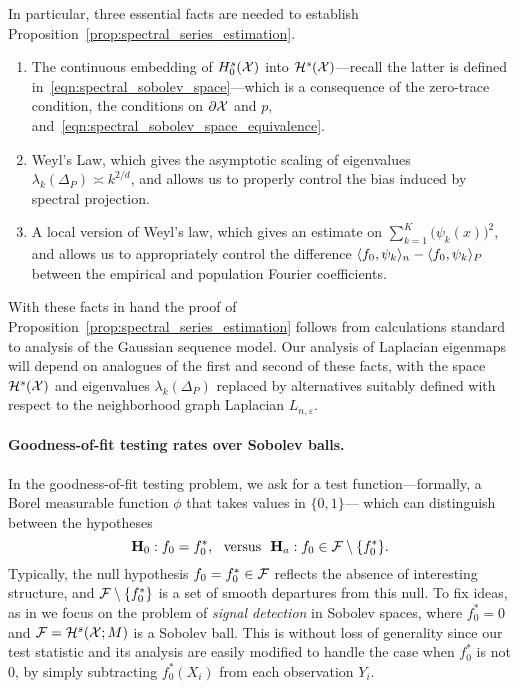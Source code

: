 In particular, three essential facts are needed to establish Proposition~\ref{prop:spectral_series_estimation}. 
\begin{enumerate}
	\item The continuous embedding of $H_0^s(\mathcal{X})$ into $\mathcal{H}^s(\mathcal{X})$---recall the latter is defined in~\eqref{eqn:spectral_sobolev_space}---which is a consequence of the zero-trace condition, the conditions on $\partial \mathcal{X}$ and $p$, and~\eqref{eqn:spectral_sobolev_space_equivalence}.
	\item Weyl's Law, which gives the asymptotic scaling of eigenvalues $\lambda_{k}(\Delta_P) \asymp k^{2/d}$, and allows us to properly control the bias induced by spectral projection.
	\item A local version of Weyl's law, which gives an estimate on $\sum_{k = 1}^{K} \bigl(\psi_k(x)\bigr)^2$, and allows us to appropriately control the difference $\langle f_0, \psi_k \rangle_n - \langle f_0, \psi_k \rangle_P$  between the empirical and population Fourier coefficients.
\end{enumerate}
With these facts in hand the proof of Proposition~\ref{prop:spectral_series_estimation} follows from calculations standard to analysis of the Gaussian sequence model. Our analysis of Laplacian eigenmaps will depend on analogues of the first and second of these facts, with the space $\mathcal{H}^s(\mathcal{X})$ and eigenvalues $\lambda_k(\Delta_P)$ replaced by alternatives suitably defined with respect to the neighborhood graph Laplacian $L_{n,\varepsilon}$.

\paragraph{Goodness-of-fit testing rates over Sobolev balls.}
In the goodness-of-fit testing problem, we ask for a test function---formally, a Borel measurable function $\phi$ that takes values in $\{0,1\}$--- which can distinguish between the hypotheses
\begin{equation}
\mathbf{H}_0: f_0 = f_0^{\ast}, ~~\textrm{versus}~~ \mathbf{H}_a: f_0 \in \mathcal{F} \setminus \{f_0^{\ast}\}.
\end{equation} 
Typically, the null hypothesis $f_0 = f_0^{\ast} \in \mathcal{F}$ reflects the absence of interesting structure, and $\mathcal{F} \setminus  \{f_0^{\ast}\}$ is a set of smooth departures from this null. To fix ideas, as in \citet{ingster2009} we focus on the problem of \emph{signal detection} in Sobolev spaces, where $f_0^{\ast} = 0$ and $\mathcal{F} = \mathcal{H}^s(\mathcal{X};M)$ is a Sobolev ball. This is without loss of generality since our test statistic and its analysis are easily modified to handle the case when $f_0^{\ast}$ is not $0$, by simply subtracting $f_0^{\ast}(X_i)$ from each observation $Y_i$.

